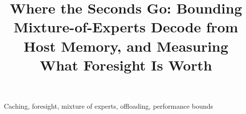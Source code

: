 \documentclass[conference]{IEEEtran}
\begin{document}
\title{Where the Seconds Go: Bounding Mixture-of-Experts Decode from Host Memory, and Measuring What Foresight Is Worth}
\maketitle

\begin{abstract}

\end{abstract}

\begin{IEEEkeywords}
Caching, foresight, mixture of experts, offloading, performance bounds
\end{IEEEkeywords}






\clearpage
\onecolumn
\appendices
{}   %

\end{document}
